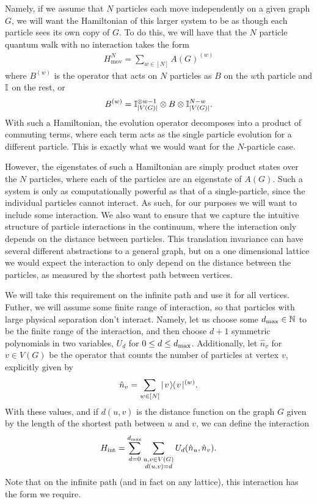 \documentclass[../thesis-main/thesis-main]{subfiles}
\begin{document}
Namely, if we assume that $N$ particles each move independently on a given graph $G$, we will want the Hamiltonian of this larger system to be as though each particle sees its own copy of $G$.  To do this, we will have that the $N$ particle quantum walk with no interaction takes the form
\begin{align}
  H_{\text{mov}}^N = \sum_{w\in [N]} A(G)^{(w)}
\end{align}
where $B^{(w)}$ is the operator that acts on $N$ particles as $B$ on the $w$th particle and $\mathbb{I}$ on the rest, or
\begin{align}
  B^{(w)} = \mathbb{I}_{|V(G)|}^{\otimes w-1} \otimes B \otimes \mathbb{I}_{|V(G)|}^{N - w}.
\end{align}
With such a Hamiltonian, the evolution operator decomposes into a product of commuting terms, where each term acts as the single particle evolution for a different particle.  This is exactly what we would want for the $N$-particle case.

However, the eigenstates of such a Hamiltonian are simply product states over the $N$ particles, where each of the particles are an eigenstate of $A(G)$.  Such a system is only as computationally powerful as that of a single-particle, since the individual particles cannot interact.  As such, for our purposes we will want to include some interaction.  We also want to ensure that we capture the intuitive structure of particle interactions in the continuum, where the interaction only depends on the distance between particles.  This translation invariance can have several different abstractions to a general graph, but on a one dimensional lattice we would expect the interaction to only depend on the distance between the particles, as measured by the shortest path between vertices.

We will take this requirement on the infinite path and use it for all vertices.  Futher, we will assume some finite range of interaction, so that particles with large physical separation don't interact.   Namely, let us choose some $d_{\text{max}} \in \mathbb{N}$ to be the finite range of the interaction, and then choose $d+1$ symmetric polynomials in two variables, $U_{d}$ for $0\leq d \leq d_{\text{max}}$.  Additionally, let $\hat{n}_v$ for $v\in V(G)$ be the operator that counts the number of particles at vertex $v$, explicitly given by 
\begin{align}
  \hat{n}_v = \sum_{w\in [N]} |\mspace{2mu} v \mspace{2mu} \rangle\mspace{-2mu}\langle\mspace{2mu} v \mspace{2mu} |^{(w)}.
\end{align}
With these values, and if $d(u,v)$ is the distance function on the graph $G$ given by the length of the shortest path between $u$ and $v$, we can define the interaction
\begin{align}
  H_{\text{int}} = \sum_{d=0}^{d_{\text{max}}} \sum_{\substack{ u,v\in V(G)\\d(u,v) = d}}U_{d} (\hat{n}_u,\hat{n}_v).
\end{align}
Note that on the infinite path (and in fact on any lattice), this interaction has the form we require.
\end{document}
